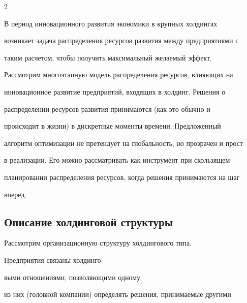 \begin{multicols}{2}
     


     В период инновационного развития экономики в крупных холдингах 


возникает задача распределения ресурсов развития между предприятиями с 


таким расчетом, чтобы получить максимальный желаемый эффект. 


Рассмотрим многоэтапную модель распределения ресурсов, влияющих на 


инновационное развитие предприятий, входящих в холдинг. Решения о 


распределении ресурсов развития принимаются (как это обычно и 


происходит в жизни) в дискретные моменты времени. Предложенный 


алгоритм оптимизации не претендует на глобальность, но прозрачен и прост 


в реализации. Его можно рассматривать как инструмент при скользящем 


планировании распределения ресурсов, когда решения принимаются на шаг 


вперед.


     


     


     \vspace*{-4pt}


     


\subsection{Описание холдинговой структуры} %





\vspace*{-1pt}


     


     Рассмотрим организационную структуру холдингового типа. 


Предприятия связаны холдинго-\linebreak\vspace*{-12pt}


\pagebreak





\noindent


выми отношениями, позволяющими одному 


из них (головной компании) определять решения, принимаемые другими 



\end{multicols}
